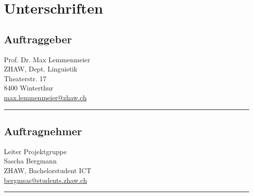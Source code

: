 \documentclass{avocado}
\newcommand{\mail}[1]{\href{mailto:#1}{#1}}
\begin{document}
\section*{Unterschriften}
\begin{minipage}[t][5cm][t]{0.45\linewidth}
\subsection*{Auftraggeber}
Prof. Dr. Max Lemmenmeier \\
ZHAW, Dept. Linguistik \\
Theaterstr. 17 \\
8400 Winterthur \\
\mail{max.lemmenmeier@zhaw.ch} \\
\vfill \hrule
\end{minipage} \hfill
\begin{minipage}[t][5cm][t]{0.45\linewidth}
\subsection*{Auftragnehmer}
Leiter Projektgruppe \\
Sascha Bergmann \\
ZHAW, Bachelorstudent ICT \\
\mail{bergmsas@students.zhaw.ch} \\
\vfill \hrule
\end{minipage} \\
\clearpage
\tableofcontents
\clearpage
\end{document}
